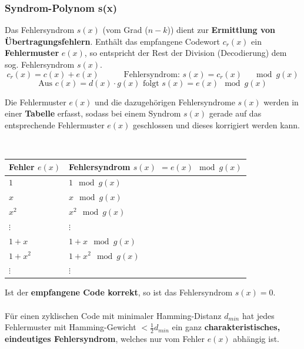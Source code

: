 \subsubsection{Syndrom-Polynom s(x)}
\begin{minipage}{13.1cm}
Das Fehlersyndrom $s(x)$ (vom Grad ($n-k$)) dient zur \textbf{Ermittlung von Übertragungsfehlern}.
Enthält das empfangene Codewort $c_r(x)$ ein \textbf{Fehlermuster} $e(x)$, so entspricht der
Rest der Division (Decodierung) dem sog. Fehlersyndrom $s(x)$.
$$ c_r(x) = c(x) + e(x) \quad \qquad \text{Fehlersyndrom: } \boxed{s(x) = c_r(x) \quad \mod{g(x)}} $$
$$ \text{Aus } c(x) = d(x)\cdot g(x) \text{ folgt } s(x) = e(x) \mod{g(x)}$$

	Die Fehlermuster $e(x)$ und die dazugehörigen Fehlersyndrome $s(x)$ werden in einer
\textbf{Tabelle} erfasst, sodass bei einem Syndrom $s(x)$ gerade auf das entsprechende Fehlermuster $e(x)$
geschlossen und dieses korrigiert werden kann.
\end{minipage} 
\begin{minipage}{0.3cm}
$\quad$
\end{minipage}
\begin{minipage}{7cm}
	\begin{tabular}{| p{1.8cm} | p{2.8cm} |}
  		\hline
  			Fehler $e(x)$ & Fehlersyndrom $s(x)$ $= e(x)  \mod{g(x)} $ \\
  		\hline
  			$1$	&	$1 \mod{g(x)}$ \\
  			$x$	&	$x \mod{g(x)}$ \\
  			$x^2$	&	$x^2 \mod{g(x)}$ \\
  			$\vdots$ & $\vdots$ \\
  			$1 + x$ &	$1+x \mod{g(x)}$ \\
  			$1 + x^2$ &	$1+x^2 \mod{g(x)}$ \\
  			$\vdots$ & $\vdots$  	\\		
  		\hline
  	\end{tabular}
\end{minipage}

Ist der \textbf{empfangene Code korrekt}, so ist das Fehlersyndrom \boldmath$s(x) =
0$\unboldmath.\\ \\
Für einen zyklischen Code mit minimaler Hamming-Distanz $d_{min}$ hat jedes
Fehlermuster mit Hamming-Gewicht $< \frac12 d_{min}$ ein ganz \textbf{charakteristisches, eindeutiges Fehlersyndrom}, welches nur vom Fehler $e(x)$
abhängig ist.

